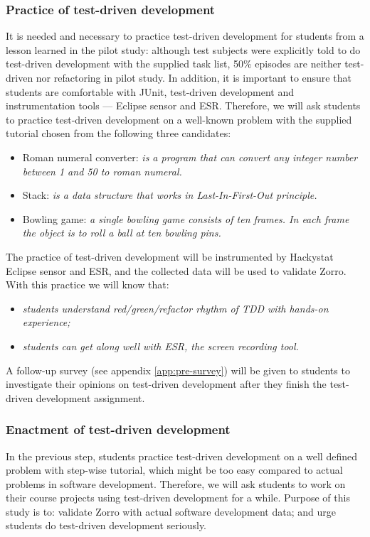 \subsubsection{Practice of test-driven development}
It is needed and necessary to practice test-driven development for students
from a lesson learned in the pilot study: although test subjects were
explicitly told to do test-driven development with the supplied task list,
50\% episodes are neither test-driven nor refactoring in pilot study. In
addition, it is important to ensure that students are comfortable with
JUnit, test-driven development and instrumentation tools --- Eclipse sensor
and ESR. Therefore, we will ask students to practice test-driven
development on a well-known problem with the supplied tutorial chosen from
the following three candidates:
\begin{itemize}
\item Roman numeral converter: \textit{is a program that can convert any
    integer number between 1 and 50 to roman numeral.}
\item Stack: \textit{is a data structure that works in Last-In-First-Out
    principle.}
\item Bowling game: \textit{a single bowling game consists of ten frames.
    In each frame the object is to roll a ball at ten bowling pins.}
\end{itemize}

The practice of test-driven development will be instrumented by Hackystat
Eclipse sensor and ESR, and the collected data will be used to validate
Zorro. With this practice we will know that:
\begin{itemize}
\item \textit{students understand red/green/refactor rhythm of TDD with
    hands-on experience;}
\item \textit{students can get along well with ESR, the screen recording
    tool.}
\end{itemize}

A follow-up survey (see appendix \ref{app:pre-survey}) will be given to
students to investigate their opinions on test-driven development after
they finish the test-driven development assignment.

\subsubsection{Enactment of test-driven development}
In the previous step, students practice test-driven development on a well
defined problem with step-wise tutorial, which might be too easy compared
to actual problems in software development. Therefore, we will ask students
to work on their course projects using test-driven development for a while.
Purpose of this study is to: validate Zorro with actual software
development data; and urge students do test-driven development seriously.

